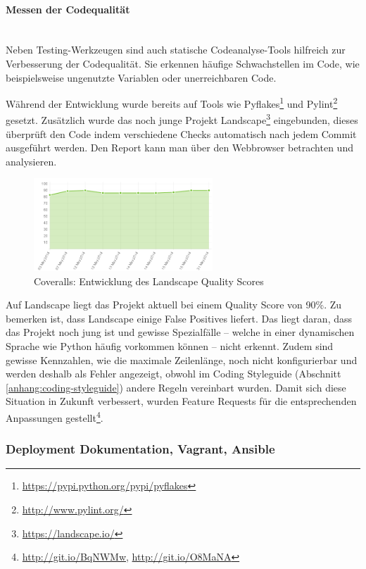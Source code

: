 \paragraph{Messen der Codequalität} \hspace{0pt} \\
Neben Testing-Werkzeugen sind auch statische Codeanalyse-Tools hilfreich zur
Verbesserung der Codequalität. Sie erkennen häufige Schwachstellen im Code, wie
beispielsweise ungenutzte Variablen oder unerreichbaren Code.

Während der Entwicklung wurde bereits auf Tools wie
Pyflakes\footnote{\url{https://pypi.python.org/pypi/pyflakes}} und
Pylint\footnote{\url{http://www.pylint.org/}} gesetzt. Zusätzlich wurde das noch
junge Projekt Landscape\footnote{\url{https://landscape.io/}} eingebunden,
dieses überprüft den Code indem verschiedene Checks automatisch nach jedem Commit
ausgeführt werden. Den Report kann man über den Webbrowser betrachten und
analysieren.

\begin{figure}[H]
	\centering
	\includegraphics[width=0.6\textwidth]{images/landscape}
	\caption{Coveralls: Entwicklung des Landscape Quality Scores}
	\label{improvements:landscape}
\end{figure}

Auf Landscape liegt das Projekt aktuell bei einem Quality Score von 90\%.
Zu bemerken ist, dass Landscape einige False Positives liefert. Das
liegt daran, dass das Projekt noch jung ist und gewisse Spezialfälle -- welche in
einer dynamischen Sprache wie Python häufig vorkommen können -- nicht erkennt.
Zudem sind gewisse Kennzahlen, wie die maximale Zeilenlänge, noch nicht
konfigurierbar und werden deshalb als Fehler angezeigt, obwohl im Coding
Styleguide (Abschnitt \ref{anhang:coding-styleguide}) andere Regeln vereinbart
wurden. Damit sich diese Situation in Zukunft verbessert, wurden Feature
Requests für die entsprechenden Anpassungen
gestellt\footnote{\url{http://git.io/BqNWMw}, \url{http://git.io/O8MaNA}}.


\subsubsection{Deployment Dokumentation, Vagrant, Ansible}


